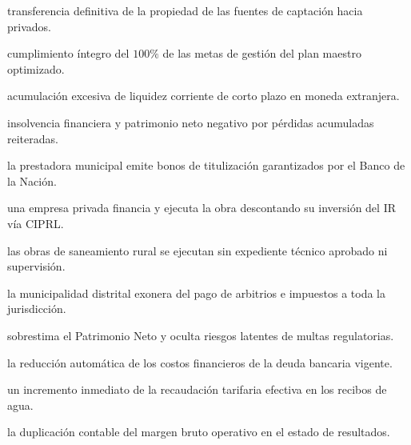 \begin{opts}
    \item transferencia definitiva de la propiedad de las fuentes de captación hacia privados.
    \item cumplimiento íntegro del $100\%$ de las metas de gestión del plan maestro optimizado.
    \item acumulación excesiva de liquidez corriente de corto plazo en moneda extranjera.
    \item insolvencia financiera y patrimonio neto negativo por pérdidas acumuladas reiteradas.
\end{opts}

\begin{opts}
    \item la prestadora municipal emite bonos de titulización garantizados por el Banco de la Nación.
    \item una empresa privada financia y ejecuta la obra descontando su inversión del IR vía CIPRL.
    \item las obras de saneamiento rural se ejecutan sin expediente técnico aprobado ni supervisión.
    \item la municipalidad distrital exonera del pago de arbitrios e impuestos a toda la jurisdicción.
\end{opts}

\begin{opts}
    \item sobrestima el Patrimonio Neto y oculta riesgos latentes de multas regulatorias.
    \item la reducción automática de los costos financieros de la deuda bancaria vigente.
    \item un incremento inmediato de la recaudación tarifaria efectiva en los recibos de agua.
    \item la duplicación contable del margen bruto operativo en el estado de resultados.
\end{opts}

